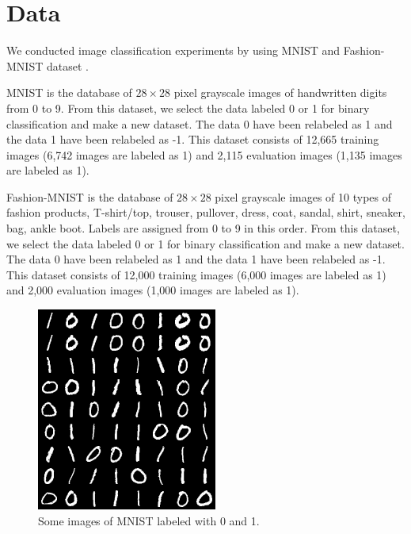 \section{Data}
\par We conducted image classification experiments by using MNIST \cite{lecun-mnisthandwrittendigit-2010} and Fashion-MNIST dataset \cite{xiao2017fashionmnist}. 

\par MNIST is the database of $28\times28$ pixel grayscale images of handwritten digits from 0 to 9. From this dataset, we select the data labeled 0 or 1 for binary classification and make a new dataset. The data 0 have been relabeled as 1 and the data 1 have been relabeled as -1. This dataset consists of 12,665 training images (6,742 images are labeled as 1) and 2,115 evaluation images (1,135 images are labeled as 1). 

\par Fashion-MNIST is the database of $28\times28$ pixel grayscale images of 10 types of fashion products,  T-shirt/top, trouser, pullover, dress, coat, sandal, shirt, sneaker, bag, ankle boot. Labels are assigned from 0 to 9 in this order. From this dataset, we select the data labeled 0 or 1 for binary classification and make a new dataset. The data 0 have been relabeled as 1 and the data 1 have been relabeled as -1. This dataset consists of 12,000 training images (6,000 images are labeled as 1) and 2,000 evaluation images (1,000 images are labeled as 1).

\begin{figure}[htb]
    \centering
    \includegraphics[keepaspectratio, scale=0.5]{experiment/figure/mnist.png}
    \caption{Some images of MNIST labeled with 0 and 1.}
    \label{fig:mnist}
\end{figure}

